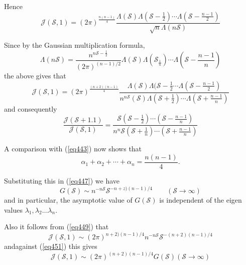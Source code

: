 Hence\pageoriginale 
$$
\mathcal{J}(\mathscr{S},1) = (2\pi)^{\frac{n(n-1)}{4}}
\frac{\Lambda(\mathscr{S}) \Lambda(\mathscr{S}-\frac{1}{2}) \cdots
  \Lambda(\mathscr{S}-\frac{n-1}{2})}{\sqrt{n}   \Lambda
  (n\mathscr{S})} 
$$

Since by the Gaussian multiplication formula,
\begin{equation*}
\Lambda ( n \mathscr{S} ) = \frac{n^{n\mathscr{S}-\frac{1}{2}}}{(2\pi
  )^{(n-1)/2}}   \Lambda(\mathscr{S}) \Lambda(\mathscr{S}_ \frac{1}{n}
) \cdots \Lambda(\mathscr{S}- \frac{n-1}{n}) \tag{448}\label{eq448} 
\end{equation*}
the above gives that 
\begin{equation*}
\mathcal{J}(\mathscr{S},1) = (2\pi)^{\frac{(n+2)(n-1)}{4}}
\frac{\Lambda(\mathscr{S})\Lambda(\mathscr{S}- \frac{1}{2}\cdots
  \Lambda(\mathscr{S}- \frac{n-1}{2})}
     {n^{n\mathscr{S}}(\mathscr{S})\Lambda(\mathscr{S}+ \frac{1}{2})
       \cdots \Lambda(\mathscr{S}+ \frac{n-1}{n})} \tag{449}\label{eq449} 
\end{equation*}
and consequently
$$
\frac{\mathcal{J}(\mathscr{S} + 1.1)}{\mathcal{J}(\mathscr{S},1)} =
\frac{\mathscr{S}(\mathscr{S}-\frac{1}{2})\cdots
  (\mathscr{S}-\frac{n-1}{n})}{n^n
  \mathscr{S}(\mathscr{S}+\frac{1}{n}) \cdots (\mathscr{S}+
  \frac{n-1}{n})} 
$$

A comparison with (\ref{eq443}) now shows that
\begin{equation*}
\alpha_1 + \alpha_2 + \cdots + \alpha_n =
\frac{n(n-1)}{4}. \tag{450}\label{eq450} 
\end{equation*}

Substituting this in (\ref{eq447}) we have
\begin{equation*}
G(\mathscr{S}) \sim n^{-n\mathscr{S}} \mathscr{S}^{-n+z)(n-1)/4}
\qquad (\mathscr{S}\rightarrow \infty) \tag{451}\label{eq451} 
\end{equation*}
and in particular, the asymptotic value of $G(\mathscr{S})$ is
independent of the eigen values $\lambda_1,\lambda_2 \ldots
\lambda_n$. 

Also it follows from (\ref{eq449}) that 
\begin{equation*}
\mathcal{J}(\mathscr{S},1) \sim (2\pi)^{n+2)(n-1)/4}
n^{-n\mathscr{S}}   \mathscr{S}^{-(n+2)(n-1)/4} \tag{452}\label{eq452} 
\end{equation*}
and\pageoriginale against (\ref{eq451}) this gives
\begin{equation*}
\mathcal{J}(\mathscr{S},1) \sim (2\pi)^{(n+2)(n-1)/4}   G(\mathscr{S})
(\mathscr{S}\rightarrow \infty) \tag{453}\label{eq453} 
\end{equation*}


